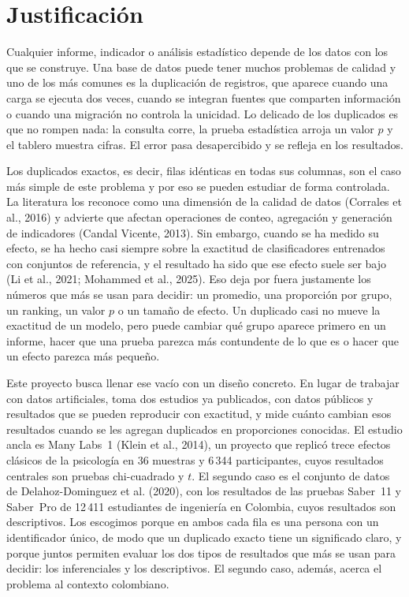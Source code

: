 \documentclass[11pt,openany,oneside,letterpaper]{book}
\begin{document}
\chapter{Justificación}

Cualquier informe, indicador o análisis estadístico depende de los datos con los que se construye. Una base de datos puede tener muchos problemas de calidad y uno de los más comunes es la duplicación de registros, que aparece cuando una carga se ejecuta dos veces, cuando se integran fuentes que comparten información o cuando una migración no controla la unicidad. Lo delicado de los duplicados es que no rompen nada: la consulta corre, la prueba estadística arroja un valor $p$ y el tablero muestra cifras. El error pasa desapercibido y se refleja en los resultados.

Los duplicados exactos, es decir, filas idénticas en todas sus columnas, son el caso más simple de este problema y por eso se pueden estudiar de forma controlada. La literatura los reconoce como una dimensión de la calidad de datos (Corrales et al., 2016) y advierte que afectan operaciones de conteo, agregación y generación de indicadores (Candal Vicente, 2013). Sin embargo, cuando se ha medido su efecto, se ha hecho casi siempre sobre la exactitud de clasificadores entrenados con conjuntos de referencia, y el resultado ha sido que ese efecto suele ser bajo (Li et al., 2021; Mohammed et al., 2025). Eso deja por fuera justamente los números que más se usan para decidir: un promedio, una proporción por grupo, un ranking, un valor $p$ o un tamaño de efecto. Un duplicado casi no mueve la exactitud de un modelo, pero puede cambiar qué grupo aparece primero en un informe, hacer que una prueba parezca más contundente de lo que es o hacer que un efecto parezca más pequeño.

Este proyecto busca llenar ese vacío con un diseño concreto. En lugar de trabajar con datos artificiales, toma dos estudios ya publicados, con datos públicos y resultados que se pueden reproducir con exactitud, y mide cuánto cambian esos resultados cuando se les agregan duplicados en proporciones conocidas. El estudio ancla es Many Labs~1 (Klein et al., 2014), un proyecto que replicó trece efectos clásicos de la psicología en 36 muestras y 6\,344 participantes, cuyos resultados centrales son pruebas chi-cuadrado y $t$. El segundo caso es el conjunto de datos de Delahoz-Dominguez et al. (2020), con los resultados de las pruebas Saber~11 y Saber~Pro de 12\,411 estudiantes de ingeniería en Colombia, cuyos resultados son descriptivos. Los escogimos porque en ambos cada fila es una persona con un identificador único, de modo que un duplicado exacto tiene un significado claro, y porque juntos permiten evaluar los dos tipos de resultados que más se usan para decidir: los inferenciales y los descriptivos. El segundo caso, además, acerca el problema al contexto colombiano.
\end{document}
